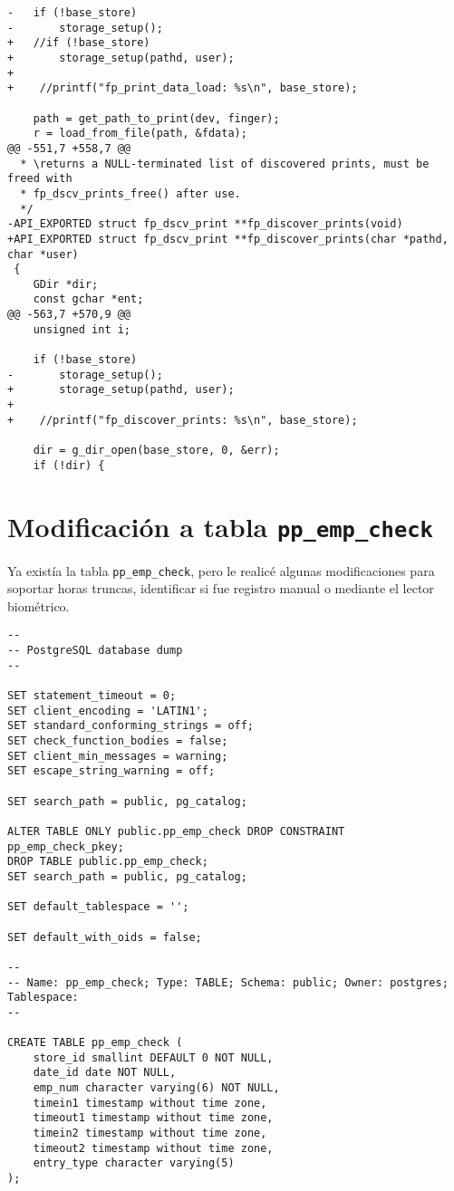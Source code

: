 \begin{appendices}
\begin{Verbatim}[fontsize=\small]
-	if (!base_store)
-		storage_setup();
+	//if (!base_store)
+		storage_setup(pathd, user);
+
+    //printf("fp_print_data_load: %s\n", base_store);
 
 	path = get_path_to_print(dev, finger);
 	r = load_from_file(path, &fdata);
@@ -551,7 +558,7 @@
  * \returns a NULL-terminated list of discovered prints, must be freed with
  * fp_dscv_prints_free() after use.
  */
-API_EXPORTED struct fp_dscv_print **fp_discover_prints(void)
+API_EXPORTED struct fp_dscv_print **fp_discover_prints(char *pathd, char *user)
 {
 	GDir *dir;
 	const gchar *ent;
@@ -563,7 +570,9 @@
 	unsigned int i;
 
 	if (!base_store)
-		storage_setup();
+		storage_setup(pathd, user);
+
+    //printf("fp_discover_prints: %s\n", base_store);
 
 	dir = g_dir_open(base_store, 0, &err);
 	if (!dir) {
\end{Verbatim}

\chapter{Modificación a tabla \texttt{pp\_emp\_check}}

Ya existía la tabla \texttt{pp\_emp\_check}, pero le realicé algunas modificaciones para soportar horas truncas, identificar si fue registro manual o mediante el lector biométrico.

\begin{Verbatim}[fontsize=\tiny]
--
-- PostgreSQL database dump
--

SET statement_timeout = 0;
SET client_encoding = 'LATIN1';
SET standard_conforming_strings = off;
SET check_function_bodies = false;
SET client_min_messages = warning;
SET escape_string_warning = off;

SET search_path = public, pg_catalog;

ALTER TABLE ONLY public.pp_emp_check DROP CONSTRAINT pp_emp_check_pkey;
DROP TABLE public.pp_emp_check;
SET search_path = public, pg_catalog;

SET default_tablespace = '';

SET default_with_oids = false;

--
-- Name: pp_emp_check; Type: TABLE; Schema: public; Owner: postgres; Tablespace: 
--

CREATE TABLE pp_emp_check (
    store_id smallint DEFAULT 0 NOT NULL,
    date_id date NOT NULL,
    emp_num character varying(6) NOT NULL,
    timein1 timestamp without time zone,
    timeout1 timestamp without time zone,
    timein2 timestamp without time zone,
    timeout2 timestamp without time zone,
    entry_type character varying(5)
);



\end{Verbatim}
\end{appendices}
